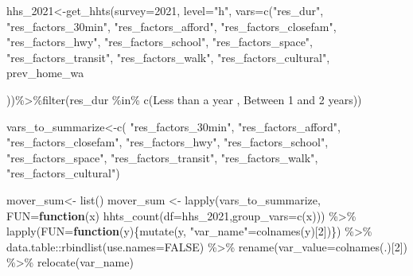 \documentclass[
]{article}
\newenvironment{Shaded}{\begin{snugshade}}{\end{snugshade}}
\newcommand{\AttributeTok}[1]{\textcolor[rgb]{0.77,0.63,0.00}{#1}}
\newcommand{\ConstantTok}[1]{\textcolor[rgb]{0.00,0.00,0.00}{#1}}
\newcommand{\ControlFlowTok}[1]{\textcolor[rgb]{0.13,0.29,0.53}{\textbf{#1}}}
\newcommand{\DecValTok}[1]{\textcolor[rgb]{0.00,0.00,0.81}{#1}}
\newcommand{\FunctionTok}[1]{\textcolor[rgb]{0.00,0.00,0.00}{#1}}
\newcommand{\NormalTok}[1]{#1}
\newcommand{\OtherTok}[1]{\textcolor[rgb]{0.56,0.35,0.01}{#1}}
\newcommand{\SpecialCharTok}[1]{\textcolor[rgb]{0.00,0.00,0.00}{#1}}
\newcommand{\StringTok}[1]{\textcolor[rgb]{0.31,0.60,0.02}{#1}}
\begin{document}
\begin{Shaded}
\begin{Highlighting}[]
\NormalTok{hhs\_2021}\OtherTok{\textless{}{-}}\FunctionTok{get\_hhts}\NormalTok{(}\AttributeTok{survey=}\StringTok{\textquotesingle{}2021\textquotesingle{}}\NormalTok{, }\AttributeTok{level=}\StringTok{"h"}\NormalTok{, }\AttributeTok{vars=}\FunctionTok{c}\NormalTok{(}\StringTok{"res\_dur"}\NormalTok{,}
\StringTok{"res\_factors\_30min"}\NormalTok{,}
\StringTok{"res\_factors\_afford"}\NormalTok{,}
\StringTok{"res\_factors\_closefam"}\NormalTok{,}
\StringTok{"res\_factors\_hwy"}\NormalTok{,}
\StringTok{"res\_factors\_school"}\NormalTok{,}
\StringTok{"res\_factors\_space"}\NormalTok{,}
\StringTok{"res\_factors\_transit"}\NormalTok{,}
\StringTok{"res\_factors\_walk"}\NormalTok{,}
\StringTok{"res\_factors\_cultural"}\NormalTok{,}
\StringTok{\textquotesingle{}prev\_home\_wa\textquotesingle{}}

\NormalTok{))}\SpecialCharTok{\%\textgreater{}\%}\FunctionTok{filter}\NormalTok{(res\_dur }\SpecialCharTok{\%in\%} \FunctionTok{c}\NormalTok{(}\StringTok{\textquotesingle{}Less than a year\textquotesingle{}}\NormalTok{ , }\StringTok{\textquotesingle{}Between 1 and 2 years\textquotesingle{}}\NormalTok{))}



\NormalTok{vars\_to\_summarize}\OtherTok{\textless{}{-}}\FunctionTok{c}\NormalTok{(}
\StringTok{"res\_factors\_30min"}\NormalTok{,}
\StringTok{"res\_factors\_afford"}\NormalTok{,}
\StringTok{"res\_factors\_closefam"}\NormalTok{,}
\StringTok{"res\_factors\_hwy"}\NormalTok{,}
\StringTok{"res\_factors\_school"}\NormalTok{,}
\StringTok{"res\_factors\_space"}\NormalTok{,}
\StringTok{"res\_factors\_transit"}\NormalTok{,}
\StringTok{"res\_factors\_walk"}\NormalTok{,}
\StringTok{"res\_factors\_cultural"}\NormalTok{)}



\NormalTok{mover\_sum}\OtherTok{\textless{}{-}} \FunctionTok{list}\NormalTok{()}
\NormalTok{mover\_sum }\OtherTok{\textless{}{-}} \FunctionTok{lapply}\NormalTok{(vars\_to\_summarize, }\AttributeTok{FUN=}\ControlFlowTok{function}\NormalTok{(x) }\FunctionTok{hhts\_count}\NormalTok{(}\AttributeTok{df=}\NormalTok{hhs\_2021,}\AttributeTok{group\_vars=}\FunctionTok{c}\NormalTok{(x))) }\SpecialCharTok{\%\textgreater{}\%}
    \FunctionTok{lapply}\NormalTok{(}\AttributeTok{FUN=}\ControlFlowTok{function}\NormalTok{(y)\{}\FunctionTok{mutate}\NormalTok{(y, }\StringTok{"var\_name"}\OtherTok{=}\FunctionTok{colnames}\NormalTok{(y)[}\DecValTok{2}\NormalTok{])\}) }\SpecialCharTok{\%\textgreater{}\%}\NormalTok{ data.table}\SpecialCharTok{::}\FunctionTok{rbindlist}\NormalTok{(}\AttributeTok{use.names=}\ConstantTok{FALSE}\NormalTok{) }\SpecialCharTok{\%\textgreater{}\%} 
    \FunctionTok{rename}\NormalTok{(}\AttributeTok{var\_value=}\FunctionTok{colnames}\NormalTok{(.)[}\DecValTok{2}\NormalTok{]) }\SpecialCharTok{\%\textgreater{}\%} \FunctionTok{relocate}\NormalTok{(var\_name)}


\end{Highlighting}
\end{Shaded}
\end{document}
